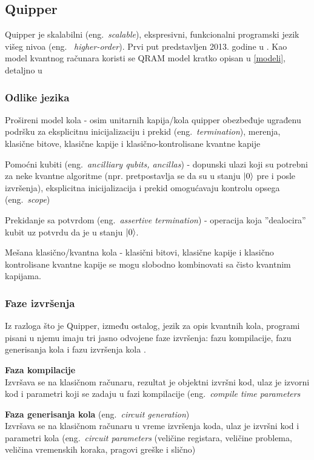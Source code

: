 \documentclass[a4paper]{article}
\begin{document}
{\subsection{Quipper}
\label{sec:quipper}

Quipper je skalabilni (eng.~\emph{scalable}), ekspresivni, funkcionalni programski jezik višeg nivoa (eng.~ \emph{higher-order}).
Prvi put predstavljen 2013. godine u \cite{quipper_language}. Kao model kvantnog računara koristi se QRAM model kratko opisan u \ref{modeli}, detaljno u \cite{qram_model} 

\subsubsection{Odlike jezika}

Prošireni model kola - osim unitarnih kapija/kola quipper obezbeđuje ugrađenu podršku za eksplicitnu inicijalizaciju i prekid (eng.~\emph{termination}), merenja, klasične bitove, klasične kapije i klasično-kontrolisane kvantne kapije 

Pomoćni kubiti (eng.~\emph{ancilliary qubits, ancillas}) - dopunski ulazi koji su potrebni za neke kvantne algoritme (npr. pretpostavlja se da su u stanju $\ket{0}$ pre i posle izvršenja), eksplicitna inicijalizacija i prekid omogućavaju kontrolu opsega (eng.~\emph{scope})

Prekidanje sa potvrdom (eng.~\emph{assertive termination}) - operacija koja ''dealocira'' kubit uz potvrdu da je u stanju $\ket{0}$.

Mešana klasično/kvantna kola - klasični bitovi, klasične kapije i klasično kontrolisane kvantne kapije se mogu slobodno kombinovati sa čisto kvantnim kapijama.

\subsubsection{Faze izvršenja}

Iz razloga što je Quipper, između ostalog, jezik za opis kvantnih kola,
programi pisani u njemu imaju tri jasno odvojene faze izvršenja:
fazu kompilacije, fazu generisanja kola i fazu izvršenja kola \cite[Section 4.3.1]{quipper_language}.

\textbf{Faza kompilacije}\\
Izvršava se na klasičnom računaru, rezultat je objektni izvršni kod, ulaz je izvorni kod i parametri koji se zadaju u fazi kompilacije (eng.~\emph{compile time parameters}

\textbf{Faza generisanja kola} (eng.~\emph{circuit generation})\\
Izvršava se na klasičnom računaru u vreme izvršenja koda, ulaz je izvršni kod i parametri kola (eng.~\emph{circuit parameters} (veličine registara, veličine problema, veličina vremenskih koraka, pragovi greške i slično)

}
\end{document}
